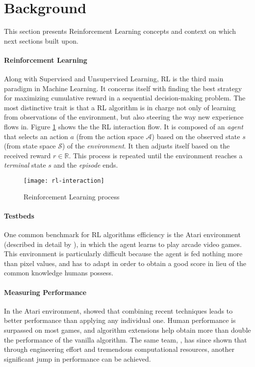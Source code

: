 \documentclass{article}
\begin{document}

\newpage
\section{Background}
\label{sec:bg}
This section presents Reinforcement Learning concepts and context on which next sections built upon.

\paragraph{Reinforcement Learning} Along with Supervised and Unsupervised Learning, RL is the third main paradigm in Machine Learning. It concerns itself with finding the best strategy for maximizing cumulative reward in a sequential decision-making problem. The most distinctive trait is that a RL algorithm is in charge not only of learning from observations of the environment, but also steering the way new experience flows in. Figure \ref{fig:rl} shows the the RL interaction flow. It is composed of an \textit{agent} that selects an action $a$ (from the action space $\mathcal{A}$) based on the observed state $s$ (from state space $\mathcal{S}$) of the \textit{environment}. It then adjusts itself based on the received reward $r \in \mathbb{R}$. This process is repeated until the environment reaches a \textit{terminal} state $s$ and the \textit{episode} ends.

\begin{figure}[h]
  \centering
  \texttt{[image: rl-interaction]}
  \caption{Reinforcement Learning process}
  \label{fig:rl}
\end{figure}

\paragraph{Testbeds} One common benchmark for RL algorithms efficiency is the Atari environment (described in detail by \cite{atari}), in which the agent learns to play arcade video games. This environment is particularly difficult because the agent is fed nothing more than pixel values, and has to adapt in order to obtain a good score in lieu of the common knowledge humans possess.

\paragraph{Measuring Performance} In the Atari environment, \cite{rainbow} showed that combining recent techniques leads to better performance than applying any individual one. Human performance is surpassed on most games, and algorithm extensions help obtain more than double the performance of the vanilla algorithm. The same team, \cite{ape}, has since shown that through engineering effort and tremendous computational resources, another significant jump in performance can be achieved.
\end{document}
